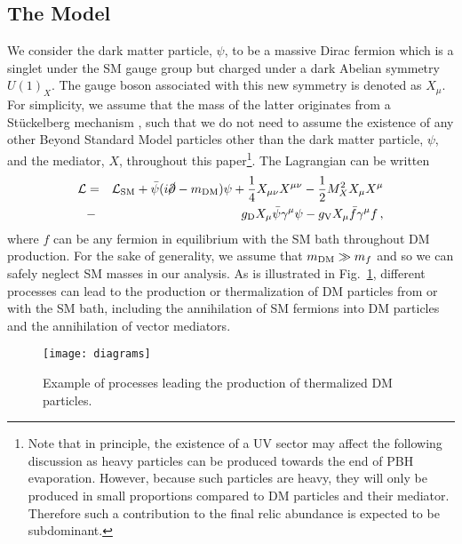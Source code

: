 \documentclass[aps,prd,reprint,twocolumn,preprintnumbers,floatfix,nofootinbib]{revtex4-1}
\newcommand{\bea}{\begin{eqnarray}}
\newcommand{\eea}{\end{eqnarray}}
\begin{document}
\subsection{The Model}
 We consider the dark matter particle, $\psi$, to be a massive Dirac fermion which is a singlet under the SM gauge group but charged under a dark Abelian symmetry $U(1)_X$. The gauge boson associated with this new symmetry is denoted as $X_\mu$. For simplicity, we assume that the mass of the latter originates from a St\"uckelberg mechanism \cite{Stueckelberg:1900zz}, such that we do not need to assume the existence of any other Beyond Standard Model particles other than the dark matter particle, $\psi$, and the mediator, $X$, throughout this paper\footnote{Note that in principle, the existence of a UV sector may affect the following discussion as heavy particles can be produced towards the end of PBH evaporation. However, because such particles are heavy, they will only be produced in small proportions compared to DM particles and their mediator. Therefore such a contribution to the final relic abundance is expected to be subdominant.}. The Lagrangian can be written
\bea
\mathcal L &=& \mathcal L_{\rm SM}+\bar\psi(i\cancel{\partial}-m_{\rm DM})\psi
+\frac{1}{4}X_{\mu\nu}X^{\mu\nu}-\frac{1}{2}M_X^2 X_\mu X^\mu \nonumber\\ &-& g_{\rm D} X_\mu\bar\psi\gamma^\mu\psi- g_{\rm V} X_\mu\bar f\gamma^\mu f\,,
\eea
where $f$ can be any fermion in equilibrium with the SM bath throughout DM production. For the sake of generality, we assume that $m_{\rm DM}\gg m_f$ and so we can safely neglect SM masses in our analysis. As is illustrated in Fig.~\ref{fig:diagrams}, different processes can lead to the production or thermalization of DM particles from or with the SM bath, including the annihilation of SM fermions into DM particles and the annihilation of vector mediators. 
\begin{figure}
 \texttt{[image: diagrams]}
 \caption{Example of processes leading the production of thermalized DM particles.}\label{fig:diagrams} 
\end{figure}
\end{document}
